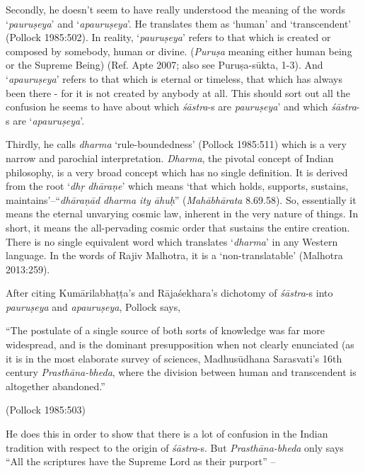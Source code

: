 Secondly, he doesn't seem to have really understood the meaning of the words `{\it pauruṣeya}' and `{\it apauruṣeya}'. He translates them as `human' and `transcendent' (Pollock 1985:502). In reality, `{\it pauruṣeya}' refers to that which is created or composed by somebody, human or divine. ({\it Puruṣa} meaning either human being or the Supreme Being) (Ref. Apte 2007; also see Puruṣa-sūkta, 1-3). And `{\it apauruṣeya}' refers to that which is eternal or timeless, that which has always been there - for it is not created by anybody at all. This should sort out all the confusion he seems to have about which {\it śāstra}-s are {\it pauruṣeya}' and which {\it śāstra}-s are `{\it apauruṣeya}'. 

Thirdly, he calls {\it dharma} `rule-boundedness' (Pollock 1985:511) which is a very narrow and parochial interpretation. {\it Dharma}, the pivotal concept of Indian philosophy, is a very broad concept which has no single definition. It is derived from the root `\textsl{dhṛ dhāraṇe}' which means `that which holds, supports, sustains, maintains'--``\textsl{dhāraṇād dharma ity āhuḥ}'' ({\it Mahābhārata} 8.69.58). So, essentially it means the eternal unvarying cosmic law, inherent in the very nature of things. In short, it means the all-pervading cosmic order that sustains the entire creation. There is no single equivalent word which translates `{\it dharma}' in any Western language. In the words of Rajiv Malhotra, it is a `non-translatable' (Malhotra 2013:259).

After citing Kumārilabhaṭṭa's and Rājaśekhara's dichotomy of {\it śāstra}-s into {\it pauruṣeya} and {\it apauruṣeya}, Pollock says,
\begin{myquote}
``The postulate of a single source of both sorts of knowledge was far more widespread, and is the dominant presupposition when not clearly enunciated (as it is in the most elaborate survey of sciences, Madhusūdhana Sarasvati's 16th century {\sl Prasthāna-bheda}, where the division between human and transcendent is altogether abandoned.'' 

\hfill (Pollock 1985:503)
\end{myquote}

He does this in order to show that there is a lot of confusion in the Indian tradition with respect to the origin of {\sl śāstra}-s. But {\sl Prasthāna-bheda} only says ``All the scriptures have the Supreme Lord as their purport'' -- 

